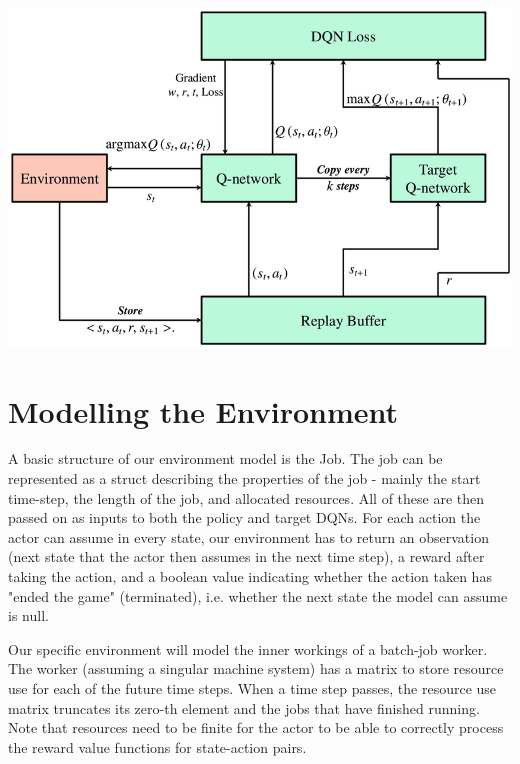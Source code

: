 \documentclass{article}
\begin{document}
\begin{spacing}{2.0}
\begin{center}
    \includegraphics[scale=0.35]{./images/A-Concept-of-DQN-Algorithm7.png}
\end{center}

\newpage
\section{Modelling the Environment}

A basic structure of our environment model is the Job. The job can be represented as a struct describing the properties of the job - mainly the start time-step, the
length of the job, and allocated resources. All of these are then passed on as inputs to both the policy and target DQNs. For each action the actor can assume in
every state, our environment has to return an observation (next state that the actor then assumes in the next time step), a reward after taking the action, and a
boolean value indicating whether the action taken has "ended the game" (terminated), i.e. whether the next state the model can assume is null.

Our specific environment will model the inner workings of a batch-job worker. The worker (assuming a singular machine system) has a matrix to store resource use for
each of the future time steps. When a time step passes, the resource use matrix truncates its zero-th element and the jobs that have finished running. Note that resources
need to be finite for the actor to be able to correctly process the reward value functions for state-action pairs.


\end{spacing}
\end{document}
